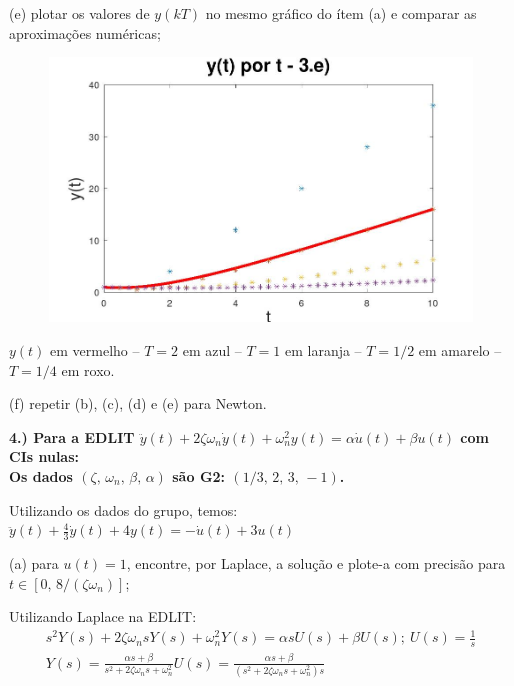 \documentclass[10pt]{article}
\begin{document}
(e) plotar os valores de $y(kT)$ no mesmo gráfico do ítem (a) e comparar as aproximações numéricas;

\begin{figure}[h]
    \includegraphics[scale=0.4]{questao3e.jpg}
    \centering
\end{figure}
$y(t)$ em vermelho -- $T = 2$ em azul -- $T = 1$ em laranja -- $T = 1/2$ em amarelo -- $T = 1/4$ em roxo.

(f) repetir (b), (c), (d) e (e) para Newton.

\vspace{\baselineskip}


\textbf{4.) Para a EDLIT $\ddot{y}(t) + 2\zeta \omega_n \dot{y}(t) + \omega_n^2 y(t) = \alpha \dot{u}(t) + \beta u(t)$ com CIs nulas:\\
Os dados $(\zeta,\, \omega_n,\, \beta,\, \alpha)$ são \textbf{G2: }$(1/3,\, 2,\, 3,\, -1)$.}

Utilizando os dados do grupo, temos: $\ddot{y}(t) + \frac{4}{3} \dot{y}(t) + 4 y(t) = -\dot{u}(t) + 3u(t)$

(a) para $u(t) = 1$, encontre, por Laplace, a solução e plote-a com precisão para $t \in [0,\, 8/(\zeta \omega_n)]$;

\vspace{\baselineskip}

Utilizando Laplace na EDLIT:
\begin{align*}
    s^2Y(s) + 2\zeta \omega_n sY(s) + \omega_n^2 Y(s) = \alpha sU(s) + \beta U(s); \ U(s) = \frac{1}{s} \\
    Y(s) = \frac{\alpha s + \beta}{s^2 + 2\zeta \omega_n s + \omega_n^2} U(s) = \frac{\alpha s + \beta}{(s^2 + 2\zeta \omega_n s + \omega_n^2)s}
\end{align*}
\end{document}
